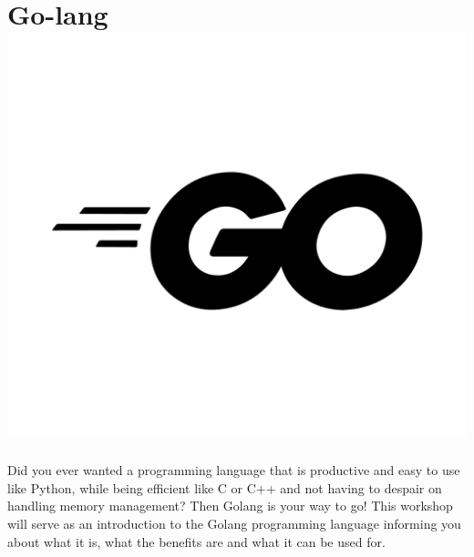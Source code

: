 
\section*{Go-lang\hfill\includegraphics[width=.35\linewidth]{images/GolangLogo.png}}

Did you ever wanted a programming language that is productive and easy to use like Python, while being efficient like C or C++ and not having to despair on handling memory management? Then Golang is your way to go!
This workshop will serve as an introduction to the Golang programming language informing you about what it is, what the benefits are and what it can be used for.


 
